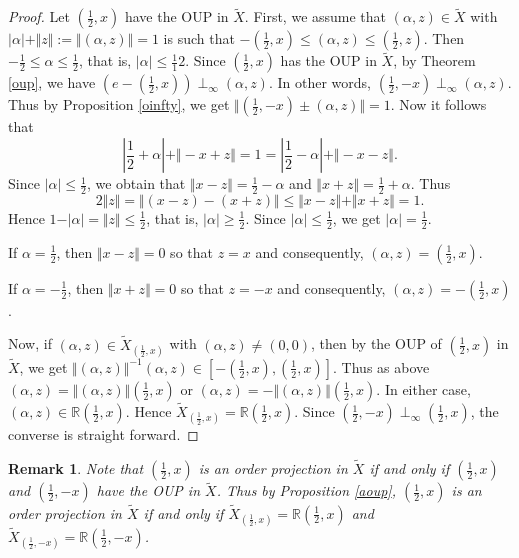 \documentclass[12pt]{amsart}
\newtheorem{remark}[theorem]{Remark}
\begin{document}
\begin{proof}
	Let $(\frac 12, x)$ have the OUP in $\widetilde{X}$. First, we assume that $(\alpha, z) \in \widetilde{X}$ with $\vert \alpha \vert + \Vert z \Vert := \Vert (\alpha, z) \Vert = 1$ is such that $- (\frac 12, x) \le (\alpha, z) \le (\frac 12, z)$. Then $- \frac 12 \le \alpha \le \frac 12$, that is, $\vert \alpha \vert \le \frac 112$. Since $(\frac 12, x)$ has the OUP in $\widetilde{X}$, by Theorem \ref{oup}, we have $(e - (\frac 12, x)) \perp_{\infty} (\alpha, z)$. In other words, $(\frac 12, - x) \perp_{\infty} (\alpha, z)$. Thus by Proposition \ref{oinfty}, we get $\Vert (\frac 12, - x) \pm (\alpha, z) \Vert = 1$. Now it follows that 
	$$\left\vert \frac 12 + \alpha \right\vert + \Vert - x + z \Vert = 1 = \left\vert \frac 12 - \alpha \right\vert + \Vert - x - z \Vert.$$ 
	Since $\vert \alpha \vert \le \frac 12$, we obtain that $\Vert x - z \Vert = \frac 12 - \alpha$ and $\Vert x + z \Vert = \frac 12 + \alpha$. Thus 
	$$2 \Vert z \Vert = \Vert (x - z) - (x + z) \Vert \le \Vert x - z \Vert + \Vert x + z \Vert = 1.$$ 
	Hence $1 - \vert \alpha \vert = \Vert z \Vert \le \frac 12$, that is, $\vert \alpha \vert \ge \frac 12$. Since $\vert \alpha \vert \le \frac 12$, we get $\vert \alpha \vert = \frac 12$. 
	
	If $\alpha = \frac 12$, then $\Vert x - z \Vert = 0$ so that $z = x$ and consequently, $(\alpha, z) = (\frac 12, x)$. 
	
	If $\alpha = - \frac 12$, then $\Vert x + z \Vert = 0$ so that $z = - x$ and consequently, $(\alpha, z) = - (\frac 12, x)$. 
	
	Now, if $(\alpha, z) \in \widetilde{X}_{(\frac 12, x)}$ with $(\alpha, z) \ne (0, 0)$, then by the OUP of $(\frac 12, x)$ in $\widetilde{X}$, we get $\Vert (\alpha, z) \Vert^{-1} (\alpha, z) \in \left[ - (\frac 12, x), (\frac 12, x) \right]$. Thus as above $(\alpha, z) = \Vert (\alpha, z) \Vert (\frac 12, x)$ or $(\alpha, z) = - \Vert (\alpha, z) \Vert (\frac 12, x)$. In either case, $(\alpha, z) \in \mathbb{R} (\frac 12, x)$. Hence $\widetilde{X}_{(\frac 12, x)} = \mathbb{R} (\frac 12, x)$. Since $(\frac 12, - x) \perp_{\infty} (\frac 12, x)$, the converse is straight forward. 
\end{proof} 
\begin{remark}
	Note that $(\frac 12, x)$ is an order projection in $\widetilde{X}$ if and only if $(\frac 12, x)$ and $(\frac 12, - x)$ have the OUP in $\widetilde{X}$. Thus by Proposition \ref{aoup}, $(\frac 12, x)$ is an order projection in $\widetilde{X}$ if and only if $\tilde{X}_{(\frac 12, x)} = \mathbb{R} (\frac 12, x)$ and $\tilde{X}_{(\frac 12, - x)} = \mathbb{R} (\frac 12, - x)$.
\end{remark}
\end{document}
